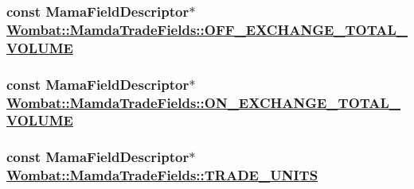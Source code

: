 \hypertarget{classWombat_1_1MamdaTradeFields_aea6105e2943749ac8bdd0f9b32dfb3e}{
\subsubsection[OFF\_\-EXCHANGE\_\-TOTAL\_\-VOLUME]{\setlength{\rightskip}{0pt plus 5cm}const Mama\-Field\-Descriptor$\ast$ \hyperlink{classWombat_1_1MamdaTradeFields_aea6105e2943749ac8bdd0f9b32dfb3e}{Wombat::Mamda\-Trade\-Fields::OFF\_\-EXCHANGE\_\-TOTAL\_\-VOLUME}}}
\label{classWombat_1_1MamdaTradeFields_aea6105e2943749ac8bdd0f9b32dfb3e}


\hypertarget{classWombat_1_1MamdaTradeFields_02d88960945dd4ddcd80129a4d5712d7}{
\subsubsection[ON\_\-EXCHANGE\_\-TOTAL\_\-VOLUME]{\setlength{\rightskip}{0pt plus 5cm}const Mama\-Field\-Descriptor$\ast$ \hyperlink{classWombat_1_1MamdaTradeFields_02d88960945dd4ddcd80129a4d5712d7}{Wombat::Mamda\-Trade\-Fields::ON\_\-EXCHANGE\_\-TOTAL\_\-VOLUME}}}
\label{classWombat_1_1MamdaTradeFields_02d88960945dd4ddcd80129a4d5712d7}


\hypertarget{classWombat_1_1MamdaTradeFields_6bc190d6110f6d474dabc2724d71fa5f}{
\subsubsection[TRADE\_\-UNITS]{\setlength{\rightskip}{0pt plus 5cm}const Mama\-Field\-Descriptor$\ast$ \hyperlink{classWombat_1_1MamdaTradeFields_6bc190d6110f6d474dabc2724d71fa5f}{Wombat::Mamda\-Trade\-Fields::TRADE\_\-UNITS}}}
\label{classWombat_1_1MamdaTradeFields_6bc190d6110f6d474dabc2724d71fa5f}


